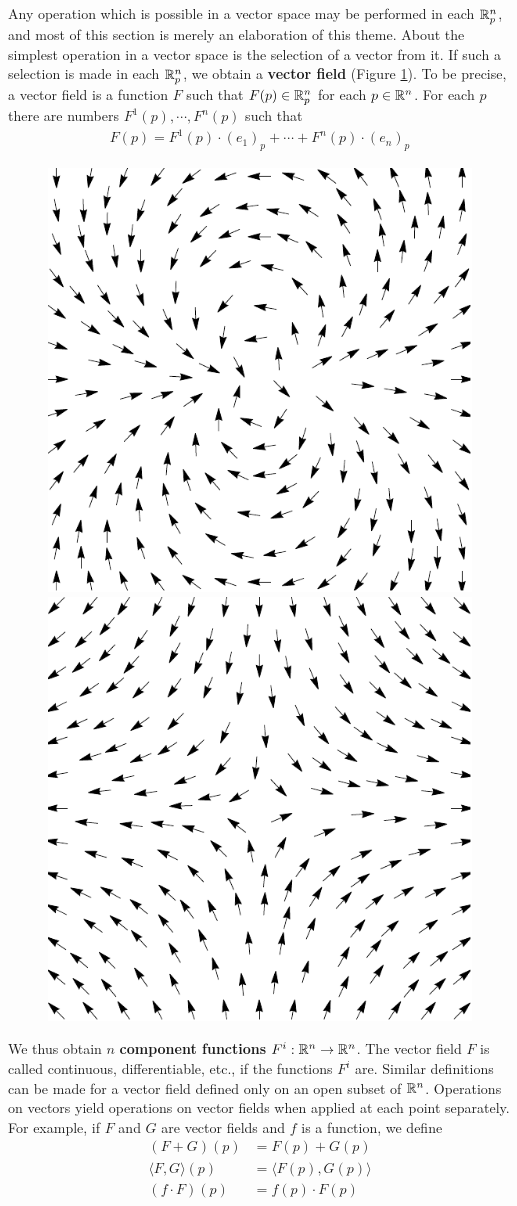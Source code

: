Any operation which is possible in a vector space may be
performed in each $\mathbb{R}^n_p$, and most of this section is merely an
elaboration of this theme. About the simplest operation in a vector space is the 
selection of a vector from it. If such a selection is made in each $\mathbb{R}^n_p$, we 
obtain a \textbf{vector field} (Figure \ref{Fig 4-2}). To be precise, a vector field is a 
function $F$ such that $F(p)\in \mathbb{R}^n_p$ for each $p\in\mathbb{R}^n$. For each 
$p$ there are numbers $F^1(p), \cdots,F^n(p)$ such that
\begin{align*}
    F(p) = F^1(p)\cdot (e_1)_p + \cdots + F^n(p)\cdot (e_n)_p
\end{align*}

\begin{figure}[!htb]
    \centering
    \includegraphics[width=.4\linewidth, angle=90]{./pics/Fig4-2-(1).pdf}
    \includegraphics[width=.4\linewidth, angle=90]{./pics/Fig4-2-(2).pdf}
    \caption{}
    \label{Fig 4-2}
\end{figure}

We thus obtain $n$ \textbf{component functions} $F^i:\mathbb{R}^n\to \mathbb{R}^n$.
The vector field $F$ is called continuous, differentiable, etc., if the
functions $F^i$ are. Similar definitions can be made for a vector
field defined only on an open subset of $\mathbb{R}^n$. Operations on
vectors yield operations on vector fields when applied at each
point separately. For example, if $F$ and $G$ are vector fields
and $f$ is a function, we define
\begin{align*}
    (F+G)(p) & = F(p) + G(p) \\
    \langle F, G\rangle(p) & = \langle F(p), G(p)\rangle \\
    (f\cdot F)(p) & = f(p)\cdot F(p)
\end{align*}

